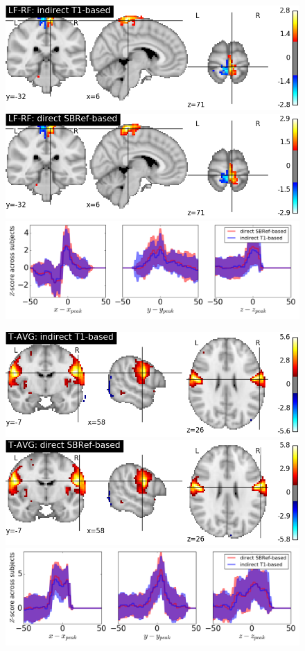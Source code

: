 \begin{figure}[!htbp]
\includegraphics[width=.48\linewidth]{figures/LF-RF_DC+T1.png}
\includegraphics[width=.48\linewidth]{figures/LF-RF_DC+SBRef.png}
\includegraphics[width=1\linewidth]{figures/LF-RF_blobs.png}


\includegraphics[width=.48\linewidth]{figures/T-AVG_DC+T1.png}
\includegraphics[width=.48\linewidth]{figures/T-AVG_DC+SBRef.png}
\includegraphics[width=1\linewidth]{figures/T-AVG_blobs.png}


\end{figure}
